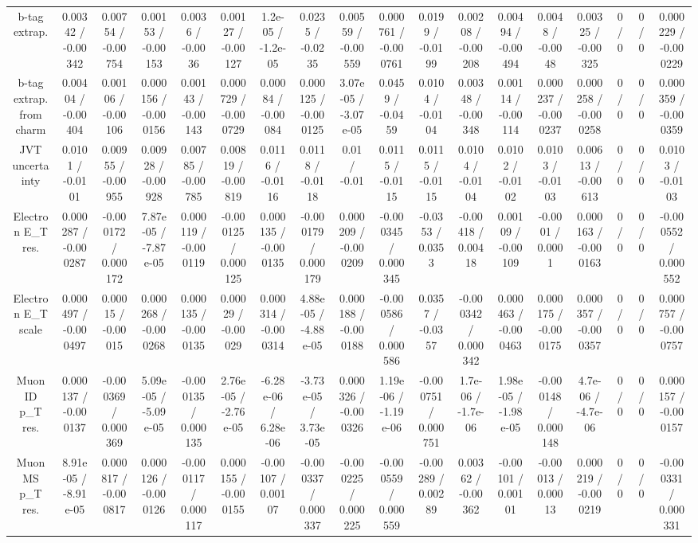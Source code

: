 \documentclass[10pt]{article}
\begin{document}
\begin{table}[htbp]
\begin{center}
\begin{tabular}{|c|c|c|c|c|c|c|c|c|c|c|c|c|c|c|c|c|c|}
  b-tag extrap. & 0.00342 / -0.00342 & 0.00754 / -0.00754 & 0.00153 / -0.00153 & 0.0036 / -0.0036 & 0.00127 / -0.00127 & 1.2e-05 / -1.2e-05 & 0.0235 / -0.0235 & 0.00559 / -0.00559 & 0.000761 / -0.000761 & 0.0199 / -0.0199 & 0.00208 / -0.00208 & 0.00494 / -0.00494 & 0.0048 / -0.0048 & 0.00325 / -0.00325 & 0 / 0 & 0 / 0 & 0.000229 / -0.000229 \\ 
  b-tag extrap. from charm & 0.00404 / -0.00404 & 0.00106 / -0.00106 & 0.000156 / -0.000156 & 0.00143 / -0.00143 & 0.000729 / -0.000729 & 0.00084 / -0.00084 & 0.000125 / -0.000125 & 3.07e-05 / -3.07e-05 & 0.0459 / -0.0459 & 0.0104 / -0.0104 & 0.00348 / -0.00348 & 0.00114 / -0.00114 & 0.000237 / -0.000237 & 0.000258 / -0.000258 & 0 / 0 & 0 / 0 & 0.000359 / -0.000359 \\ 
  JVT uncertainty & 0.0101 / -0.0101 & 0.00955 / -0.00955 & 0.00928 / -0.00928 & 0.00785 / -0.00785 & 0.00819 / -0.00819 & 0.0116 / -0.0116 & 0.0118 / -0.0118 & 0.01 / -0.01 & 0.0115 / -0.0115 & 0.0115 / -0.0115 & 0.0104 / -0.0104 & 0.0102 / -0.0102 & 0.0103 / -0.0103 & 0.00613 / -0.00613 & 0 / 0 & 0 / 0 & 0.0103 / -0.0103 \\ 
  Electron E_{T} res. & 0.000287 / -0.000287 & -0.000172 / 0.000172 & 7.87e-05 / -7.87e-05 & 0.000119 / -0.000119 & -0.000125 / 0.000125 & 0.000135 / -0.000135 & -0.000179 / 0.000179 & 0.000209 / -0.000209 & -0.000345 / 0.000345 & -0.0353 / 0.0353 & -0.00418 / 0.00418 & 0.00109 / -0.00109 & -0.0001 / 0.0001 & 0.000163 / -0.000163 & 0 / 0 & 0 / 0 & -0.000552 / 0.000552 \\ 
  Electron E_{T} scale & 0.000497 / -0.000497 & 0.00015 / -0.00015 & 0.000268 / -0.000268 & 0.000135 / -0.000135 & 0.00029 / -0.00029 & 0.000314 / -0.000314 & 4.88e-05 / -4.88e-05 & 0.000188 / -0.000188 & -0.000586 / 0.000586 & 0.0357 / -0.0357 & -0.000342 / 0.000342 & 0.000463 / -0.000463 & 0.000175 / -0.000175 & 0.000357 / -0.000357 & 0 / 0 & 0 / 0 & 0.000757 / -0.000757 \\ 
  Muon ID p_{T} res. & 0.000137 / -0.000137 & -0.000369 / 0.000369 & 5.09e-05 / -5.09e-05 & -0.000135 / 0.000135 & 2.76e-05 / -2.76e-05 & -6.28e-06 / 6.28e-06 & -3.73e-05 / 3.73e-05 & 0.000326 / -0.000326 & 1.19e-06 / -1.19e-06 & -0.000751 / 0.000751 & 1.7e-06 / -1.7e-06 & 1.98e-05 / -1.98e-05 & -0.000148 / 0.000148 & 4.7e-06 / -4.7e-06 & 0 / 0 & 0 / 0 & 0.000157 / -0.000157 \\ 
  Muon MS p_{T} res. & 8.91e-05 / -8.91e-05 & 0.000817 / -0.000817 & 0.000126 / -0.000126 & -0.000117 / 0.000117 & 0.000155 / -0.000155 & -0.00107 / 0.00107 & -0.000337 / 0.000337 & -0.000225 / 0.000225 & -0.000559 / 0.000559 & -0.00289 / 0.00289 & 0.00362 / -0.00362 & -0.00101 / 0.00101 & -0.00013 / 0.00013 & 0.000219 / -0.000219 & 0 / 0 & 0 / 0 & -0.000331 / 0.000331 \\ 

\end{tabular}
\end{center}
\end{table}
\end{document}
